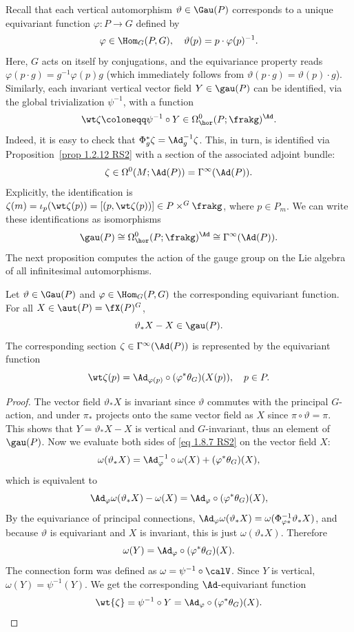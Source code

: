 Recall that each vertical automorphism $\vartheta\in \Gau(P)$ corresponds to a unique equivariant function $\varphi:P\to G$ defined by 
\[\varphi\in \Hom_G(P,G),\quad \vartheta(p)=p\cdot \varphi(p)^{-1}.\]
Here, $G$ acts on itself by conjugations, and the equivariance property reads $\varphi(p\cdot g)=g^{-1}\varphi(p)g$ (which immediately follows from $\vartheta(p\cdot g)=\vartheta(p)\cdot g$). Similarly, each invariant vertical vector field $Y\in \gau(P)$ can be identified, via the global trivialization $\psi^{-1}$, with a function 
\[\wt\zeta\coloneqq \psi^{-1}\circ Y\in \Omega^0_{\hor}(P;\frakg)^\Ad.\]
Indeed, it is easy to check that $\Phi_g^\ast \zeta=\Ad_g^{-1}\zeta$. This, in turn, is identified via Proposition~\ref{prop 1.2.12 RS2} with a section of the associated adjoint bundle: 
\[\zeta\in \Omega^0(M;\Ad(P))=\Gamma^\infty(\Ad(P)).\]
Explicitly, the identification is $\zeta(m)=\iota_p(\wt\zeta(p))=[(p,\wt\zeta(p))]\in P\times^G \frakg$, where $p\in P_m$.
We can write these identifications as isomorphisms
\[\gau(P)\cong \Omega^0_{\hor}(P;\frakg)^\Ad\cong \Gamma^\infty(\Ad(P)).\]
The next proposition computes the action of the gauge group on the Lie algebra of all infinitesimal automorphisms.

\begin{prop}
    Let $\vartheta\in\Gau(P)$ and $\varphi\in \Hom_G(P,G)$ the corresponding equivariant function. For all $X\in\aut(P)=\fX(P)^G$,
    \[\vartheta_\ast X-X\in\gau(P).\]
    The corresponding section $\zeta \in\Gamma^\infty(\Ad(P))$ is represented by the equivariant function
    \[\wt\zeta(p)=\Ad_{\varphi(p)}\circ(\varphi^\ast \theta_G)(X(p)),\quad p\in P.\]
\end{prop}
\begin{proof}
    The vector field $\vartheta_\ast X$ is invariant since $\vartheta$ commutes with the principal $G$-action, and under $\pi_\ast$ projects onto the same vector field as $X$ since $\pi\circ\vartheta=\pi$. This shows that $Y=\vartheta_\ast X-X$ is vertical and $G$-invariant, thus an element of $\gau(P)$. Now we evaluate both sides of \eqref{eq 1.8.7 RS2} on the vector field $X$:
    \[\omega(\vartheta_\ast X)=\Ad_{\varphi}^{-1}\circ \omega(X)+(\varphi^\ast \theta_G)(X),\]
    which is equivalent to
    \[\Ad_\varphi\omega(\vartheta_\ast X)-\omega(X)=\Ad_\varphi\circ (\varphi^\ast \theta_G)(X),\]
    By the equivariance of principal connections, $\Ad_\varphi\omega(\vartheta_\ast X)=\omega(\Phi_{\varphi\ast}^{-1}\vartheta_\ast X)$, and because $\vartheta$ is equivariant and $X$ is invariant, this is just $\omega(\vartheta_\ast X)$. Therefore
    \[\omega(Y)=\Ad_\varphi\circ (\varphi^\ast \theta_G)(X).\]
    The connection form was defined as $\omega=\psi^{-1}\circ\calV$. Since $Y$ is vertical, $\omega(Y)=\psi^{-1}(Y)$. We get the corresponding $\Ad$-equivariant function
    \[\wt{\zeta}=\psi^{-1}\circ Y=\Ad_\varphi\circ (\varphi^\ast\theta_G)(X).\]
\end{proof}

